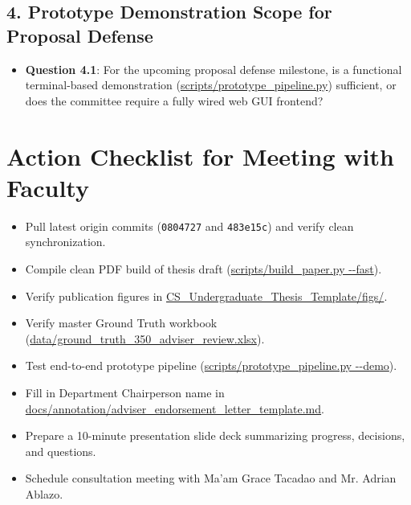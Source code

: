 \documentclass[10pt,letterpaper]{article}
\begin{document}
\subsection{4. Prototype Demonstration Scope for Proposal Defense}
\begin{itemize}
    \item \textbf{Question 4.1}: For the upcoming proposal defense milestone, is a functional terminal-based demonstration (\url{scripts/prototype_pipeline.py}) sufficient, or does the committee require a fully wired web GUI frontend?
\end{itemize}

\section{Action Checklist for Meeting with Faculty}
\begin{itemize}[leftmargin=2em]
    \item[$\boxtimes$] Pull latest origin commits (\texttt{0804727} and \texttt{483e15c}) and verify clean synchronization.
    \item[$\boxtimes$] Compile clean PDF build of thesis draft (\url{scripts/build_paper.py --fast}).
    \item[$\boxtimes$] Verify publication figures in \url{CS_Undergraduate_Thesis_Template/figs/}.
    \item[$\boxtimes$] Verify master Ground Truth workbook (\url{data/ground_truth_350_adviser_review.xlsx}).
    \item[$\boxtimes$] Test end-to-end prototype pipeline (\url{scripts/prototype_pipeline.py --demo}).
    \item[$\square$] Fill in Department Chairperson name in \url{docs/annotation/adviser_endorsement_letter_template.md}.
    \item[$\square$] Prepare a 10-minute presentation slide deck summarizing progress, decisions, and questions.
    \item[$\square$] Schedule consultation meeting with Ma'am Grace Tacadao and Mr. Adrian Ablazo.
\end{itemize}
\end{document}
